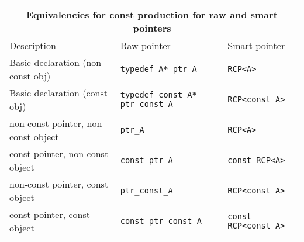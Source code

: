 \begin{tabular}{|l|l|l|}
%
\multicolumn{3}{c}{\textbf{Equivalencies for const production for raw and smart pointers}} \\
\hline
Description
& Raw pointer 
& Smart pointer \\
\hline
\hline
Basic declaration (non-const obj)
& {}\texttt{typedef A* ptr\_A}
& {}\texttt{RCP<A>} \\
\hline
Basic declaration (const obj)
& {}\texttt{typedef const A* ptr\_const\_A}
& {}\texttt{RCP<const A>} \\
\hline
\hline
non-const pointer, non-const object
& {}\texttt{ptr\_A}
& {}\texttt{RCP<A>} \\
\hline
const pointer, non-const object
& {}\texttt{const ptr\_A}
& {}\texttt{const RCP<A>} \\
\hline
non-const pointer, const object
& {}\texttt{ptr\_const\_A}
& {}\texttt{RCP<const A>} \\
\hline
const pointer, const object
& {}\texttt{const ptr\_const\_A}
& {}\texttt{const RCP<const A>} \\
\hline
\end{tabular}
